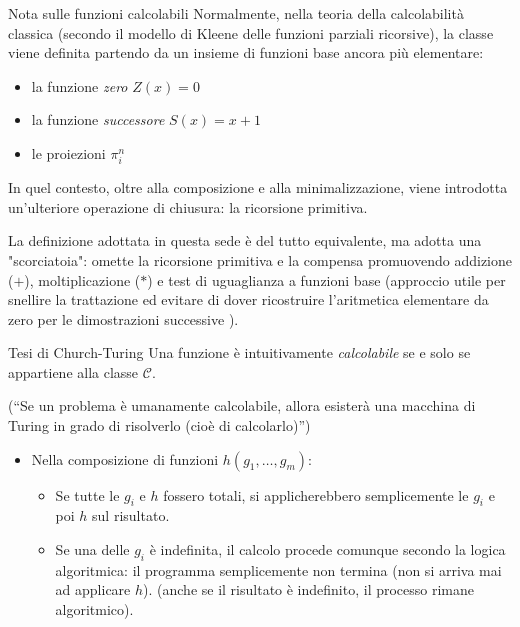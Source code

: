 \documentclass[a4paper,11pt]{report}
\begin{document}
\begin{gframe}{Nota sulle funzioni calcolabili}
  Normalmente, nella teoria della calcolabilità classica (secondo il modello di Kleene delle funzioni parziali ricorsive), la classe viene definita partendo da un insieme di funzioni base ancora più elementare: 
\begin{itemize}
    \item la funzione \textit{zero} $Z(x) = 0$
    \item la funzione \textit{successore} $S(x) = x + 1$
    \item le proiezioni $\pi_i^n$
\end{itemize}
In quel contesto, oltre alla composizione e alla minimalizzazione, viene introdotta un'ulteriore operazione di chiusura: la ricorsione primitiva. 

La definizione adottata in questa sede è del tutto equivalente, ma adotta una "scorciatoia": omette la ricorsione primitiva e la compensa promuovendo addizione ($+$), moltiplicazione ($*$) e test di uguaglianza a funzioni base (approccio utile per snellire la trattazione ed evitare di dover ricostruire l'aritmetica elementare da zero per le dimostrazioni successive ).
\end{gframe}


\begin{propframe}{Tesi di Church-Turing}{}
    Una funzione è intuitivamente \textit{calcolabile} se e solo se appartiene alla classe $\mathcal{C}$.

    {\color{gray}(``Se un problema è umanamente calcolabile, allora esisterà una macchina di Turing in grado di risolverlo (cioè di calcolarlo)'')}
\end{propframe}

\begin{itemize}
    \item Nella composizione di funzioni $h(g_1, \dots, g_m)$:
    \begin{itemize}
        \item Se tutte le $g_i$ e $h$ fossero totali, si applicherebbero semplicemente le $g_i$ e poi $h$ sul risultato.
        \item Se una delle $g_i$ è indefinita, il calcolo procede comunque secondo la logica algoritmica: il programma semplicemente non termina (non si arriva mai ad applicare $h$).
            \subitem (anche se il risultato è indefinito, il processo rimane algoritmico).
    \end{itemize}
\end{itemize}
\end{document}
